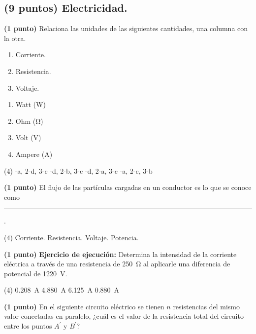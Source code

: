 \documentclass[12pt, letter]{exam}
\begin{document}
\begin{questions}
    \section{(9 puntos) Electricidad.}

    \question \textbf{(1 punto)} Relaciona las unidades de las siguientes cantidades, una columna con la otra.
    \\
    \begin{minipage}[t]{0.4\linewidth}
        \begin{enumerate}[label=\arabic*)]
            \item Corriente.
            \item Resistencia.
            \item Voltaje.
        \end{enumerate}
    \end{minipage}
    \begin{minipage}[t]{0.4\linewidth}
        \begin{enumerate}[label=\alph*)]
            \item Watt (\si{\watt})
            \item Ohm (\si{\ohm})
            \item Volt (\si{\volt})
            \item Ampere (\si{\ampere})
        \end{enumerate}
    \end{minipage}
    \begin{tasks}(4)
        -a, 2-d, 3-c
        -d, 2-b, 3-c
        -d, 2-a, 3-c
        -a, 2-c, 3-b
    \end{tasks}
    \question \textbf{(1 punto)} El flujo de las partículas cargadas en un conductor es lo que se conoce como \rule{2cm}{0.1mm}.
    \begin{tasks}(4)
        \task Corriente.
        \task Resistencia.
        \task Voltaje.
        \task Potencia.
    \end{tasks}
    \question \textbf{(1 punto)} \label{Problema_01} \textbf{Ejercicio de ejecución: } Determina la intensidad de la corriente eléctrica a través de una resistencia de \SI{250}{\ohm} al aplicarle una diferencia de potencial de \SI{1220}{\volt}.
    \begin{tasks}(4)
        \task \SI{0.208}{\ampere}
        \task \SI{4.880}{\ampere}
        \task \SI{6.125}{\ampere}
        \task \SI{0.880}{\ampere}
    \end{tasks}
    \question \textbf{(1 punto)} En el siguiente circuito eléctrico se tienen $n$ resistencias del mismo valor conectadas en paralelo, ¿cuál es el valor de la resistencia total del circuito entre los puntos $A^{\prime}$ y $B^{\prime}$?

\end{questions}
\end{document}
